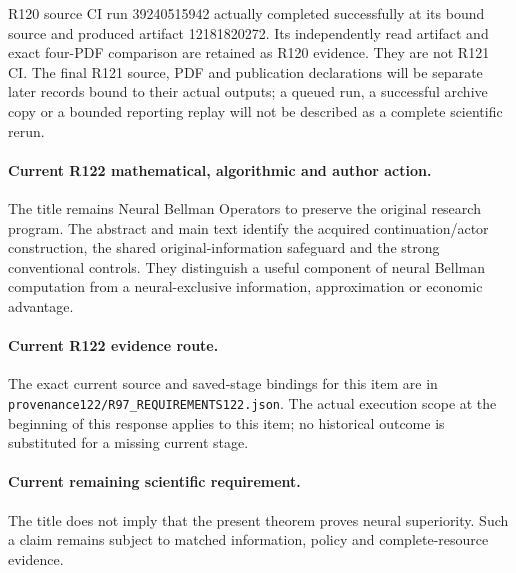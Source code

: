 R120 source CI run 39240515942 actually completed successfully at its bound
source and produced artifact 12181820272. Its independently read artifact
and exact four-PDF comparison are retained as R120 evidence. They are not
R121 CI. The final R121 source, PDF and publication declarations will be
separate later records bound to their actual outputs; a queued run, a
successful archive copy or a bounded reporting replay will not be described
as a complete scientific rerun.
\paragraph{Current R122 mathematical, algorithmic and author action.}
The title remains Neural Bellman Operators to preserve the original research program. The abstract and main text identify the acquired continuation/actor construction, the shared original-information safeguard and the strong conventional controls. They distinguish a useful component of neural Bellman computation from a neural-exclusive information, approximation or economic advantage.
\paragraph{Current R122 evidence route.}
The exact current source and saved-stage bindings for this item are in \nolinkurl{provenance122/R97_REQUIREMENTS122.json}. The actual execution scope at the beginning of this response applies to this item; no historical outcome is substituted for a missing current stage.
\paragraph{Current remaining scientific requirement.}
The title does not imply that the present theorem proves neural superiority. Such a claim remains subject to matched information, policy and complete-resource evidence.

